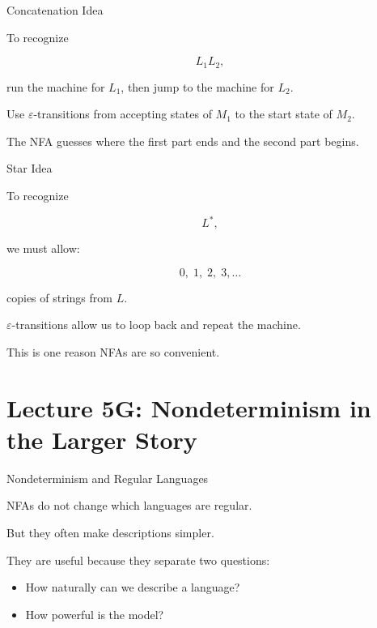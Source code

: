 \documentclass[10pt,aspectratio=169]{beamer}
\newcommand{\eps}{\varepsilon}
\begin{document}
\begin{frame}{Concatenation Idea}

To recognize

\[
L_1L_2,
\]

run the machine for \(L_1\), then jump to the machine for \(L_2\).

\vspace{1em}

Use \(\eps\)-transitions from accepting states of \(M_1\) to the start state of \(M_2\).

\vspace{1em}

The NFA guesses where the first part ends and the second part begins.

\end{frame}

\begin{frame}{Star Idea}

To recognize

\[
L^*,
\]

we must allow:

\[
0,\;1,\;2,\;3,\ldots
\]

copies of strings from \(L\).

\vspace{1em}

\(\eps\)-transitions allow us to loop back and repeat the machine.

\vspace{1em}

This is one reason NFAs are so convenient.

\end{frame}

\section{Lecture 5G: Nondeterminism in the Larger Story}

\begin{frame}{Nondeterminism and Regular Languages}

NFAs do not change which languages are regular.

\vspace{1em}

But they often make descriptions simpler.

\vspace{1em}

They are useful because they separate two questions:

\begin{itemize}
\item How naturally can we describe a language?
\item How powerful is the model?
\end{itemize}

\end{frame}
\end{document}
